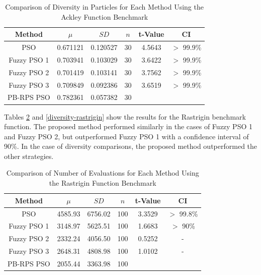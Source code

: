 \begin{table}[!t]
  \renewcommand{\arraystretch}{1.3}
  \caption{Comparison of Diversity in Particles for Each Method Using the Ackley Function Benchmark}
  \label{diversity-ackley}
  \centering
  \begin{tabular}{|c|c|c|c|c|c|}
    \hline
    Method & $\mu$ & $SD$ & $n$ & t-Value & CI \\
    \hline
    PSO 		& 0.671121 & 0.120527 & 30 & 4.5643 & $>$ 99.9\% \\
    \hline
    Fuzzy PSO 1 & 0.703941 & 0.103029 & 30 & 3.6422 & $>$ 99.9\% \\
    \hline
    Fuzzy PSO 2 & 0.701419 & 0.103141 & 30 & 3.7562 & $>$ 99.9\% \\
    \hline
    Fuzzy PSO 3 & 0.709849 & 0.092386 & 30 & 3.6519 & $>$ 99.9\% \\
    \hline
    PB-RPS PSO  & 0.782361 & 0.057382 & 30 &  &  \\
    \hline
  \end{tabular}
\end{table}



Tables \ref{evaluations-rastrigin} and \ref{diversity-rastrigin} show the results for the Rastrigin benchmark function. The proposed method performed similarly in the cases of Fuzzy PSO 1 and Fuzzy PSO 2, but outperformed Fuzzy PSO 1 with a confidence interval of 90\%. In the case of diversity comparisons, the proposed method outperformed the other strategies.


\begin{table}[!t]
  \renewcommand{\arraystretch}{1.3}
  \caption{Comparison of Number of Evaluations for Each Method Using the Rastrigin Function Benchmark}
  \label{evaluations-rastrigin}
  \centering
  \begin{tabular}{|c|c|c|c|c|c|}
    \hline
    Method & $\mu$ & $SD$ & $n$ & t-Value & CI \\
    \hline
    PSO 		& 4585.93 & 6756.02 & 100 & 3.3529 & $>$ 99.8\% \\
    \hline
    Fuzzy PSO 1 & 3148.97 & 5625.51 & 100 & 1.6683 & $>$ 90\% \\
    \hline
    Fuzzy PSO 2 & 2332.24 & 4056.50 & 100 & 0.5252 & - \\
    \hline
    Fuzzy PSO 3 & 2648.31 & 4808.98 & 100 & 1.0102 & - \\
    \hline
    PB-RPS PSO  & 2055.44 & 3363.98 & 100 &  &  \\
    \hline
  \end{tabular}
\end{table}

